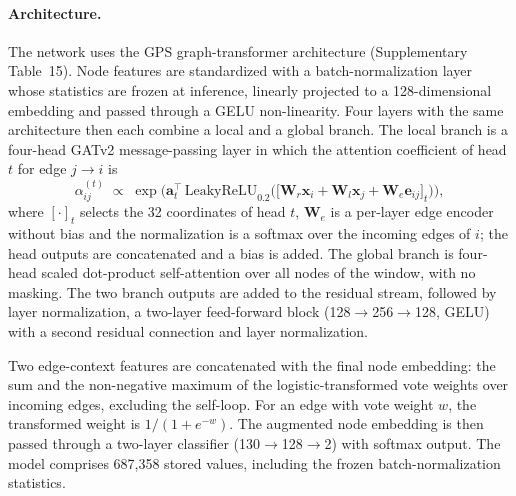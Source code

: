 \documentclass[11pt,a4paper]{article}
\begin{document}
\paragraph{Architecture.} The network uses the GPS graph-transformer architecture\cite{rampasek2022gps} (Supplementary Table~15). Node features are standardized with a batch-normalization layer whose statistics are frozen at inference, linearly projected to a 128-dimensional embedding and passed through a GELU non-linearity. Four layers with the same architecture then each combine a local and a global branch. The local branch is a four-head GATv2 message-passing layer\cite{velickovic2018gat,brody2022gatv2} in which the attention coefficient of head $t$ for edge $j \rightarrow i$ is
\begin{equation}
\alpha^{(t)}_{ij} \;\propto\; \exp\!\Big(\mathbf{a}_t^{\top}\,\mathrm{LeakyReLU}_{0.2}\big(\big[\mathbf{W}_r \mathbf{x}_i + \mathbf{W}_l \mathbf{x}_j + \mathbf{W}_e \mathbf{e}_{ij}\big]_t\big)\Big),
\end{equation}
where $[\cdot]_t$ selects the 32 coordinates of head $t$, $\mathbf{W}_e$ is a per-layer edge encoder without bias and the normalization is a softmax over the incoming edges of $i$; the head outputs are concatenated and a bias is added. The global branch is four-head scaled dot-product self-attention over all nodes of the window\cite{vaswani2017attention}, with no masking. The two branch outputs are added to the residual stream, followed by layer normalization, a two-layer feed-forward block (128$\rightarrow$256$\rightarrow$128, GELU) with a second residual connection and layer normalization.

Two edge-context features are concatenated with the final node embedding: the sum and the non-negative maximum of the logistic-transformed vote weights over incoming edges, excluding the self-loop. For an edge with vote weight $w$, the transformed weight is $1/(1+e^{-w})$. The augmented node embedding is then passed through a two-layer classifier (130$\rightarrow$128$\rightarrow$2) with softmax output. The model comprises 687,358 stored values, including the frozen batch-normalization statistics.
\end{document}
